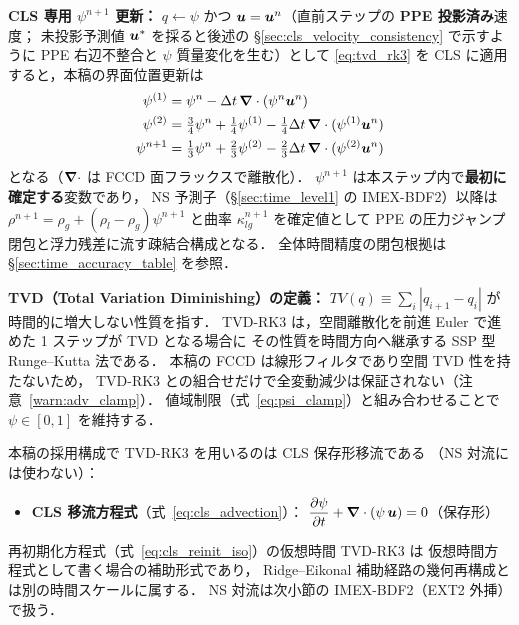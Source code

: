 \noindent\textbf{CLS 専用 $\psi^{n+1}$ 更新：}
$q \leftarrow \psi$ かつ $\bm{u}=\bm{u}^n$（直前ステップの \textbf{PPE 投影済み}速度；
未投影予測値 $\bm{u}^*$ を採ると後述の §\ref{sec:cls_velocity_consistency} で示すように
PPE 右辺不整合と $\psi$ 質量変化を生む）として
\eqref{eq:tvd_rk3} を CLS に適用すると，本稿の界面位置更新は
\begin{align}
  \psi^{(1)} &= \psi^n - \Delta t\,\bm{\nabla}\cdot(\psi^n \bm{u}^n) \notag\\
  \psi^{(2)} &= \tfrac{3}{4}\psi^n + \tfrac{1}{4}\psi^{(1)}
               - \tfrac{1}{4}\Delta t\,\bm{\nabla}\cdot(\psi^{(1)}\bm{u}^n) \notag\\
  \psi^{n+1} &= \tfrac{1}{3}\psi^n + \tfrac{2}{3}\psi^{(2)}
               - \tfrac{2}{3}\Delta t\,\bm{\nabla}\cdot(\psi^{(2)}\bm{u}^n)
  \label{eq:cls_tvd_rk3_psi}
\end{align}
となる（$\bm{\nabla}\cdot$ は FCCD 面フラックスで離散化）．
$\psi^{n+1}$ は本ステップ内で\textbf{最初に確定する}変数であり，
NS 予測子（§\ref{sec:time_level1} の IMEX-BDF2）以降は
$\rho^{n+1} = \rho_g + (\rho_l - \rho_g)\psi^{n+1}$ と曲率 $\kappa_{lg}^{n+1}$
を確定値として PPE の圧力ジャンプ閉包と浮力残差に流す疎結合構成となる．
全体時間精度の閉包根拠は §\ref{sec:time_accuracy_table} を参照．

\noindent\textbf{TVD（Total Variation Diminishing）の定義：}
$TV(q) \equiv \sum_i |q_{i+1} - q_i|$ が時間的に増大しない性質を指す．
TVD-RK3 は，空間離散化を前進 Euler で進めた 1 ステップが TVD となる場合に
その性質を時間方向へ継承する SSP 型 Runge--Kutta 法である．
本稿の FCCD は線形フィルタであり空間 TVD 性を持たないため，
TVD-RK3 との組合せだけで全変動減少は保証されない（注意~\ref{warn:adv_clamp}）．
値域制限（式~\eqref{eq:psi_clamp}）と組み合わせることで $\psi \in [0,1]$ を維持する．

\begin{tcolorbox}[warnbox, title={TVD-RK3 の適用範囲}]
\label{warn:tvd_rk3_scope}
本稿の採用構成で TVD-RK3 を用いるのは CLS 保存形移流である
（NS 対流には使わない）：
\begin{itemize}
  \item \textbf{CLS 移流方程式}（式~\eqref{eq:cls_advection}）：
        $\dfrac{\partial \psi}{\partial t} + \bm{\nabla}\cdot(\psi\,\bm{u}) = 0$（保存形）
\end{itemize}
再初期化方程式（式~\eqref{eq:cls_reinit_iso}）の仮想時間 TVD-RK3 は
仮想時間方程式として書く場合の補助形式であり，
Ridge--Eikonal 補助経路の幾何再構成とは別の時間スケールに属する．
NS 対流は次小節の IMEX-BDF2（EXT2 外挿）で扱う．
\end{tcolorbox}

